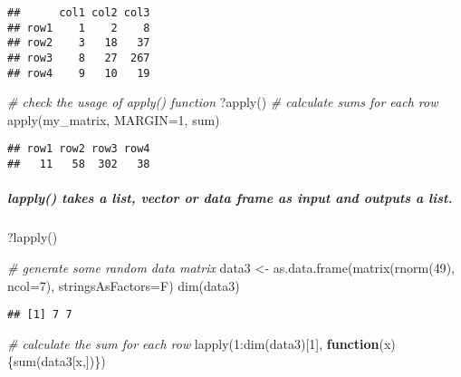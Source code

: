 \documentclass[
]{article}
\newenvironment{Shaded}{\begin{snugshade}}{\end{snugshade}}
\newcommand{\AttributeTok}[1]{\textcolor[rgb]{0.77,0.63,0.00}{#1}}
\newcommand{\CommentTok}[1]{\textcolor[rgb]{0.56,0.35,0.01}{\textit{#1}}}
\newcommand{\ControlFlowTok}[1]{\textcolor[rgb]{0.13,0.29,0.53}{\textbf{#1}}}
\newcommand{\DecValTok}[1]{\textcolor[rgb]{0.00,0.00,0.81}{#1}}
\newcommand{\FunctionTok}[1]{\textcolor[rgb]{0.00,0.00,0.00}{#1}}
\newcommand{\NormalTok}[1]{#1}
\newcommand{\OtherTok}[1]{\textcolor[rgb]{0.56,0.35,0.01}{#1}}
\newcommand{\SpecialCharTok}[1]{\textcolor[rgb]{0.00,0.00,0.00}{#1}}
\begin{document}
\begin{verbatim}
##      col1 col2 col3
## row1    1    2    8
## row2    3   18   37
## row3    8   27  267
## row4    9   10   19
\end{verbatim}

\begin{Shaded}
\begin{Highlighting}[]
\CommentTok{\# check the usage of apply() function}
\NormalTok{?}\FunctionTok{apply}\NormalTok{()}
\CommentTok{\# calculate sums for each row}
\FunctionTok{apply}\NormalTok{(my\_matrix, }\AttributeTok{MARGIN=}\DecValTok{1}\NormalTok{, sum)}
\end{Highlighting}
\end{Shaded}

\begin{verbatim}
## row1 row2 row3 row4 
##   11   58  302   38
\end{verbatim}

\hypertarget{lapply-takes-a-list-vector-or-data-frame-as-input-and-outputs-a-list.}{%
\subparagraph{lapply() takes a list, vector or data frame as input and
outputs a
list.}\label{lapply-takes-a-list-vector-or-data-frame-as-input-and-outputs-a-list.}}

\begin{Shaded}
\begin{Highlighting}[]
\NormalTok{?}\FunctionTok{lapply}\NormalTok{()}

\CommentTok{\# generate some random data matrix}
\NormalTok{data3 }\OtherTok{\textless{}{-}} \FunctionTok{as.data.frame}\NormalTok{(}\FunctionTok{matrix}\NormalTok{(}\FunctionTok{rnorm}\NormalTok{(}\DecValTok{49}\NormalTok{), }\AttributeTok{ncol=}\DecValTok{7}\NormalTok{), }\AttributeTok{stringsAsFactors=}\NormalTok{F)}
\FunctionTok{dim}\NormalTok{(data3)}
\end{Highlighting}
\end{Shaded}

\begin{verbatim}
## [1] 7 7
\end{verbatim}

\begin{Shaded}
\begin{Highlighting}[]
\CommentTok{\# calculate the sum for each row}
\FunctionTok{lapply}\NormalTok{(}\DecValTok{1}\SpecialCharTok{:}\FunctionTok{dim}\NormalTok{(data3)[}\DecValTok{1}\NormalTok{], }\ControlFlowTok{function}\NormalTok{(x)\{}\FunctionTok{sum}\NormalTok{(data3[x,])\})}
\end{Highlighting}
\end{Shaded}
\end{document}
